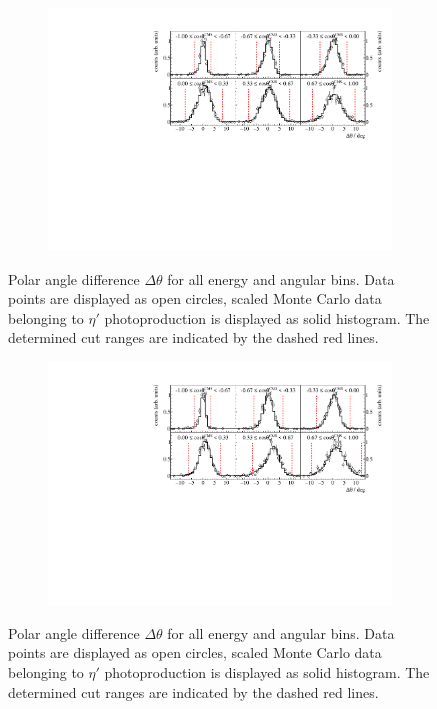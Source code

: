 \begin{figure}[H]
	\begin{subfigure}{\linewidth}
		\includegraphics[width=\linewidth]{../figs/hydrogen/bin_cuts/thetacut_ebin2.pdf}
	\end{subfigure}
\caption{Polar angle difference $\Delta\theta$ for all energy and angular bins. Data points are displayed as open circles, scaled Monte Carlo data belonging to $\eta'$ photoproduction is displayed as solid histogram. The determined cut ranges are indicated by the dashed red lines.}
\end{figure}
\begin{figure}[H]
	\ContinuedFloat
	\begin{subfigure}{\linewidth}
		\includegraphics[width=\linewidth]{../figs/hydrogen/bin_cuts/thetacut_ebin3.pdf}
	\end{subfigure}
\caption{Polar angle difference $\Delta\theta$ for all energy and angular bins. Data points are displayed as open circles, scaled Monte Carlo data belonging to $\eta'$ photoproduction is displayed as solid histogram. The determined cut ranges are indicated by the dashed red lines.}
\label{fig:apptheta}	
\end{figure}
